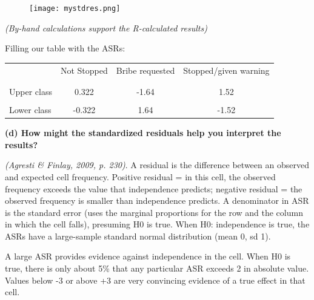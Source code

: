 \documentclass[12pt,letterpaper]{article}
\begin{document}
\begin{enumerate}
		  
		
\begin{figure}[h!]
	\centering
	\label{fig:mystdres}
	\texttt{[image: mystdres.png]}
\end{figure}	
	\vspace{1cm}
	
\begin{flushleft}
	\centering
	\textit{(By-hand calculations support the R-calculated results)} 
\end{flushleft}
		\vspace{3cm}
	
\begin{flushleft}Filling our table with the ASRs: \end{flushleft}
	\begin{table}[h]
		\centering
		\begin{tabular}{l | c c c }
			& Not Stopped & Bribe requested & Stopped/given warning \\
			\\[-1.8ex] 
			\hline \\[-1.8ex]
			Upper class  & 0.322 & -1.64 & 1.52  \\
			\\
			Lower class & -0.322 &  1.64  & -1.52   \\
			
		\end{tabular}
	\end{table}
	
\textbf{(d) How might the standardized residuals help you interpret the results?}  

\textit{(Agresti \& Finlay, 2009, p. 230)}. A residual is the difference between an observed and expected cell frequency. Positive residual = in this cell, the observed frequency exceeds the value that independence predicts; negative residual = the observed frequency is smaller than independence predicts. A denominator in ASR is the standard error (uses the marginal proportions for the row and the column in which the cell falls), presuming H0 is true. When H0: independence is true, the ASRs have a large-sample standard normal distribution (mean 0, sd 1). 

A large ASR provides evidence against independence in the cell. When H0 is true, there is only about 5\% that any particular ASR exceeds 2 in absolute value. Values below -3 or above +3 are very convincing evidence of a true effect in that cell.


\end{enumerate}
\end{document}
